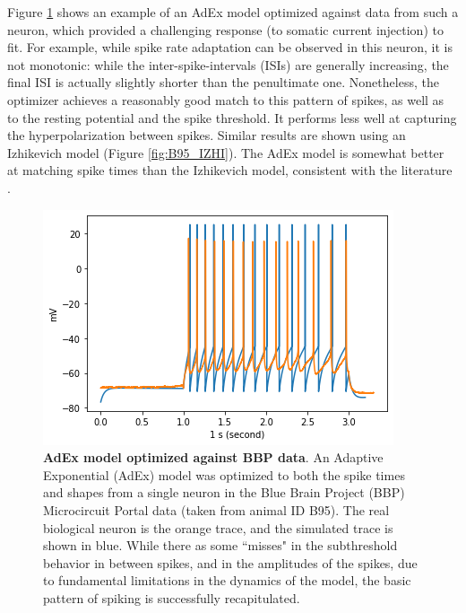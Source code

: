 Figure \ref{fig:B95Adexp} shows an example of an AdEx model optimized against data from such a neuron, which provided a challenging response (to somatic current injection) to fit.
For example, while spike rate adaptation can be observed in this neuron, it is not monotonic: while the inter-spike-intervals (ISIs) are generally increasing, the final ISI is actually slightly shorter than the penultimate one.
Nonetheless, the optimizer achieves a reasonably good match to this pattern of spikes, as well as to the resting potential and the spike threshold.
It performs less well at capturing the hyperpolarization between spikes.
Similar results are shown using an Izhikevich model (Figure \ref{fig:B95_IZHI}).
The AdEx model is somewhat better at matching spike times than the Izhikevich model, consistent with the literature \citep{rossant2011fitting}. 

\begin{figure}
    \centering
    \includegraphics[scale=0.75]{figures/bbp_multispiking_fit.png}
    \caption[Optimized AdEx model from BBP]{\textbf{AdEx model optimized against BBP data}. An Adaptive Exponential (AdEx) model was optimized to both the spike times and shapes from a single neuron in the Blue Brain Project (BBP) Microcircuit Portal data (taken from animal ID B95).
    The real biological neuron is the orange trace, and the simulated trace is shown in blue.
    While there as some ``misses" in the subthreshold behavior in between spikes, and in the amplitudes of the spikes, due to fundamental limitations in the dynamics of the model, the basic pattern of spiking is successfully recapitulated.}
    \label{fig:B95Adexp}
\end{figure}

